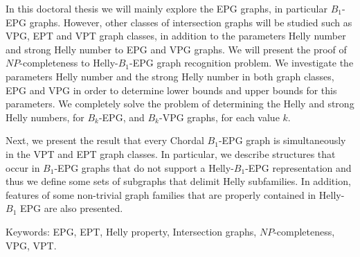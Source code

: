 \begin{foreignabstract}
In this doctoral thesis we will mainly explore the  EPG graphs, in particular $B_1$-EPG graphs. However, other classes of intersection graphs will be studied such as VPG, EPT and VPT graph classes, in addition to the parameters Helly number and strong Helly number to EPG and VPG graphs. We will present the proof of $NP$-completeness to Helly-$B_1$-EPG graph recognition problem. We investigate the parameters Helly number and the strong Helly number in both graph classes, EPG and VPG in order to determine lower bounds and upper bounds for this parameters. We completely solve the problem of determining the Helly and strong Helly numbers, for $B_k$-EPG, and $B_k$-VPG graphs, for each value $k$. 

Next, we present the result that every Chordal $B_1$-EPG graph is simultaneously in the VPT and EPT graph classes. In particular, we describe structures that occur in  $ B_1$-EPG graphs that do not support a Helly-$B_1$-EPG representation and thus we define some sets of subgraphs that delimit Helly subfamilies. 
 In addition, features of some non-trivial graph families that are properly contained in Helly-$B_1$ EPG are also presented.

Keywords: EPG, EPT, Helly property, Intersection graphs, $NP$-completeness, VPG, VPT.

\end{foreignabstract}

